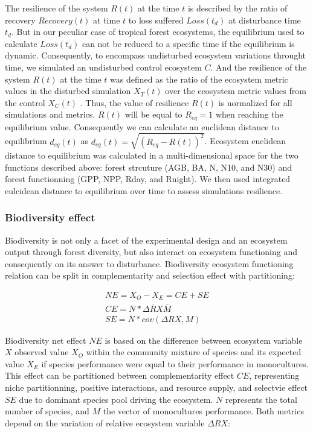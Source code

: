\documentclass[12pt,]{article}
\theoremstyle{definition}
\theoremstyle{definition}
\theoremstyle{remark}
\begin{document}
The resilience of the system \(R(t)\) at the time \(t\) is described by
the ratio of recovery \(Recovery(t)\) at time \(t\) to loss suffered
\(Loss(t_d)\) at disturbance time \(t_d\). But in our peculiar case of
tropical forest ecosystems, the equilibrium used to calculate
\(Loss(t_d)\) can not be reduced to a specific time if the equilibrium
is dynamic. Consequently, to encompass undisturbed ecosystem variations
throught time, we simulated an undisturbed control ecosystem \(C\). And
the resilience of the system \(R(t)\) at the time \(t\) was defined as
the ratio of the ecosystem metric values in the disturbed simulation
\(X_T(t)\) over the ecosystem metric values from the control \(X_C(t)\)
. Thus, the value of resilience \(R(t)\) is normalized for all
simulations and metrics. \(R(t)\) will be equal to \(R_{eq} = 1\) when
reaching the equilibrium value. Consequently we can calculate an
euclidean distance to equilibrium \(d_{eq}(t)\) as
\(d_{eq}(t) = \sqrt{(R_{eq} - R(t))^2}\). Ecosystem euclidean distance
to equilibrium was calculated in a multi-dimensional space for the two
functions described above: forest strcuture (AGB, BA, N, N10, and N30)
and forest functionning (GPP, NPP, Rday, and Rnight). We then used
integrated eulcidean distance to equilibrium over time to assess
simulations resilience.

\subsubsection{Biodiversity effect}\label{biodiversity-effect}

Biodiversity is not only a facet of the experimental design and an
ecosystem output through forest diversity, but also interact on
ecosystem functioning and consequently on its answer to disturbance.
Biodiversity ecosystem functioning relation can be split in
complementarity and selection effect with \citet{Loreau2001}
partitioning:

\begin{equation}
  \begin{array}{c}
    NE = X_O - X_E = CE + SE \\
    CE = N* \overline{\Delta RX} \overline{M}\\
    SE = N*cov(\Delta RX,M)
  \end{array}
  \label{eq:BiodivPart}
\end{equation}

Biodiversity net effect \(NE\) is based on the difference between
ecosystem variable \(X\) observed value \(X_O\) within the community
mixture of species and its expected value \(X_E\) if species performance
were equal to their performance in monocultures. This effect can be
partitioned between complementarity effect \(CE\), representing niche
partitionning, positive interactions, and resource supply, and selectvie
effect \(SE\) due to dominant species pool driving the ecosystem. \(N\)
represents the total number of species, and \(M\) the vector of
monocultures performance. Both metrics depend on the variation of
relative ecosystem variable \(\Delta RX\):
\end{document}
